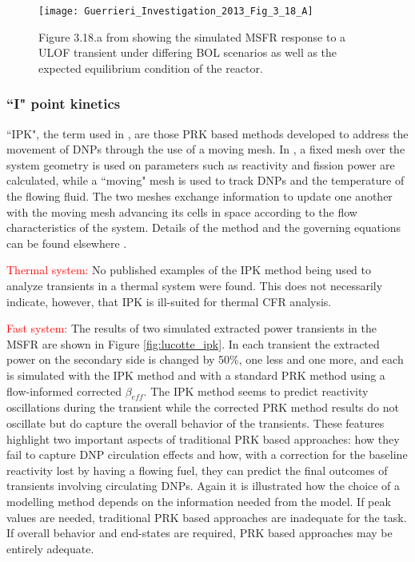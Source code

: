 \documentclass[review]{elsarticle}
\begin{document}
\begin{figure}[H]
   \centering
   \texttt{[image: Guerrieri\_Investigation\_2013\_Fig\_3\_18\_A]}
   \caption{Figure 3.18.a from \cite{guerrieri_investigation_2013} showing the simulated MSFR
   response to a ULOF transient under differing BOL scenarios as well as the
   expected equilibrium condition of the reactor.} 
   \label{fig:guerrieri_msfr_ulof}
\end{figure}


\subsubsection{``I" point kinetics} \label{sssec:spk}
``IPK", the term used in \cite{merle-lucotte_physical_2015},
are those PRK based methods developed to address the
movement of DNPs through the use of a moving mesh. In
\cite{merle-lucotte_physical_2015}, a fixed mesh over the system geometry
is used on parameters
such as reactivity and fission power are calculated, while a ``moving" mesh is
used to track DNPs and the temperature of the flowing fluid. The two
meshes exchange information to update one another with the moving mesh advancing
its cells in space according to the flow characteristics of the system.
Details of the method and
the governing equations can be found elsewhere \cite{merle-lucotte_physical_2015}.
\par \textcolor{red}{Thermal system:} No published examples of the IPK method being used
to analyze transients in a thermal system were found. This does not
necessarily indicate, however, that IPK is ill-suited for thermal CFR
analysis.
\par \textcolor{red}{Fast system:} The results of two simulated extracted power transients
in the MSFR are shown in Figure \ref{fig:lucotte_ipk}. 
In each transient the extracted power on the secondary side is changed by
50\%, one less and one more, and each is simulated with the IPK method and with a
standard PRK method using a flow-informed corrected $\beta_{eff}$. 
The IPK method seems to predict
reactivity oscillations during the transient while the
corrected PRK method results do not oscillate but do capture the
overall behavior of the transients. These features highlight two important aspects
of traditional PRK
based approaches: how they fail to capture DNP circulation effects and 
how, with a correction for the baseline reactivity lost by having a flowing fuel,
they can predict the final outcomes of transients involving
circulating DNPs. Again it is illustrated how the choice of a modelling method
depends on the information needed from the model. If peak values are needed,
traditional PRK based approaches are inadequate for the task. If overall behavior
and end-states are required, PRK based approaches may be entirely adequate.
\end{document}
